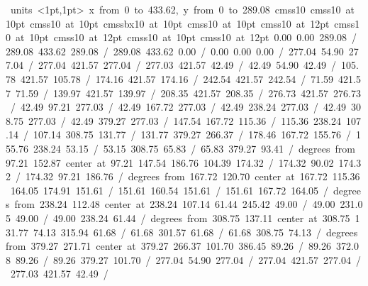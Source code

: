 \hbox{\beginpicture
\setcoordinatesystem units <1pt,1pt>
\setplotarea x from 0 to 433.62, y from 0 to 289.08
\setlinear
\font\picfont cmss10\picfont
\font\picfont cmss10 at 10pt\picfont
\font\picfont cmss10 at 10pt\picfont
\font\picfont cmssbx10 at 10pt\picfont
\font\picfont cmss10 at 10pt\picfont
\font\picfont cmss10 at 12pt\picfont
\font\picfont cmss10 at 10pt\picfont
\font\picfont cmss10 at 12pt\picfont
\font\picfont cmss10 at 10pt\picfont
\font\picfont cmss10 at 12pt\picfont
\setsolid
{} 0.00 0.00 289.08 /
 289.08 433.62 289.08 /
 289.08 433.62 0.00 /
 0.00 0.00 0.00 /
\setsolid
{} 277.04 54.90 277.04 /
 277.04 421.57 277.04 /
 277.03 421.57 42.49 /
 42.49 54.90 42.49 /
\setsolid
{} 105.78 421.57 105.78 /
\setsolid
{} 174.16 421.57 174.16 /
\setsolid
{} 242.54 421.57 242.54 /
\setsolid
{} 71.59 421.57 71.59 /
\setsolid
{} 139.97 421.57 139.97 /
\setsolid
{} 208.35 421.57 208.35 /
\setsolid
{} 276.73 421.57 276.73 /
\setsolid
{} 42.49 97.21 277.03 /
\setsolid
{} 42.49 167.72 277.03 /
\setsolid
{} 42.49 238.24 277.03 /
\setsolid
{} 42.49 308.75 277.03 /
\setsolid
{} 42.49 379.27 277.03 /
\setsolid
{} 147.54 167.72 115.36 /
 115.36 238.24 107.14 /
 107.14 308.75 131.77 /
 131.77 379.27 266.37 /
\setsolid
{} 178.46 167.72 155.76 /
 155.76 238.24 53.15 /
 53.15 308.75 65.83 /
 65.83 379.27 93.41 /
 degrees from 97.21 152.87 center at 97.21 147.54
\setsolid
{} 186.76 104.39 174.32 /
 174.32 90.02 174.32 /
 174.32 97.21 186.76 /
 degrees from 167.72 120.70 center at 167.72 115.36
\setsolid
{} 164.05 174.91 151.61 /
 151.61 160.54 151.61 /
 151.61 167.72 164.05 /
 degrees from 238.24 112.48 center at 238.24 107.14
\setsolid
{} 61.44 245.42 49.00 /
 49.00 231.05 49.00 /
 49.00 238.24 61.44 /
 degrees from 308.75 137.11 center at 308.75 131.77
\setsolid
{} 74.13 315.94 61.68 /
 61.68 301.57 61.68 /
 61.68 308.75 74.13 /
 degrees from 379.27 271.71 center at 379.27 266.37
\setsolid
{} 101.70 386.45 89.26 /
 89.26 372.08 89.26 /
 89.26 379.27 101.70 /
\setsolid
{} 277.04 54.90 277.04 /
 277.04 421.57 277.04 /
 277.03 421.57 42.49 /
}
